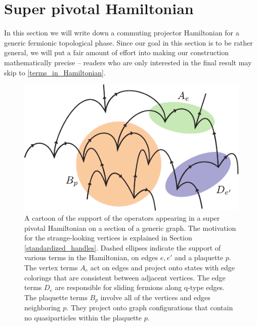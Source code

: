


 \section{Super pivotal Hamiltonian}
 \label{Super_pivotal_Hamiltonian}

In this section we will write down a commuting projector Hamiltonian 
for a generic fermionic topological phase. 
Since our goal in this section is to be rather general, we will put a fair amount of effort into making our construction 
mathematically precise -- readers who are only interested in the final result may skip to \ref{terms_in_Hamiltonian}. 

 \begin{figure}
\begin{center}
      \includegraphics{sample_latticeprime.pdf}
 \caption{A cartoon of the support of the operators appearing in a super pivotal Hamiltonian on a section of a generic graph. 
The motivation for the strange-looking vertices is explained in Section \ref{standardized_handles}.
Dashed ellipses indicate the support of various terms in the Hamiltonian, on edges $e,e'$ and a plaquette $p$.
The vertex terms $A_e$ act on edges and project onto states with edge colorings that are consistent between adjacent vertices. 
The edge terms $D_e$ are responsible for sliding fermions along q-type edges. 
The plaquette terms $B_p$ involve all of the vertices and edges neighboring $p$.
They project onto graph configurations that contain no quasiparticles within the plaquette $p$.
}
 \label{example_lattice}
 \end{center}
 \end{figure}

